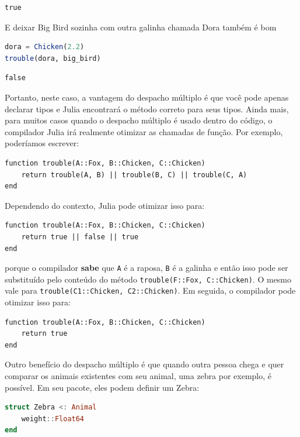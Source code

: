 \documentclass[
  notoc %
]{tufte-book}
\newcommand{\passthrough}[1]{#1}
\begin{document}
\begin{lstlisting}[language=Output]
true
\end{lstlisting}

E deixar Big Bird sozinha com outra galinha chamada Dora também é bom

\begin{lstlisting}[language=Julia]
dora = Chicken(2.2)
trouble(dora, big_bird)
\end{lstlisting}

\begin{lstlisting}[language=Output]
false
\end{lstlisting}

Portanto, neste caso, a vantagem do despacho múltiplo é que você pode
apenas declarar tipos e Julia encontrará o método correto para seus
tipos. Ainda mais, para muitos casos quando o despacho múltiplo é usado
dentro do código, o compilador Julia irá realmente otimizar as chamadas
de função. Por exemplo, poderíamos escrever:

\begin{lstlisting}
function trouble(A::Fox, B::Chicken, C::Chicken)
    return trouble(A, B) || trouble(B, C) || trouble(C, A)
end
\end{lstlisting}

Dependendo do contexto, Julia pode otimizar isso para:

\begin{lstlisting}
function trouble(A::Fox, B::Chicken, C::Chicken)
    return true || false || true
end
\end{lstlisting}

porque o compilador \textbf{sabe} que \passthrough{\lstinline!A!} é a
raposa, \passthrough{\lstinline!B!} é a galinha e então isso pode ser
substituído pelo conteúdo do método
\passthrough{\lstinline!trouble(F::Fox, C::Chicken)!}. O mesmo vale para
\passthrough{\lstinline!trouble(C1::Chicken, C2::Chicken)!}. Em seguida,
o compilador pode otimizar isso para:

\begin{lstlisting}
function trouble(A::Fox, B::Chicken, C::Chicken)
    return true
end
\end{lstlisting}

Outro benefício do despacho múltiplo é que quando outra pessoa chega e
quer comparar os animais existentes com seu animal, uma zebra por
exemplo, é possível. Em seu pacote, eles podem definir um Zebra:

\begin{lstlisting}[language=Julia]
struct Zebra <: Animal
    weight::Float64
end
\end{lstlisting}
\end{document}
